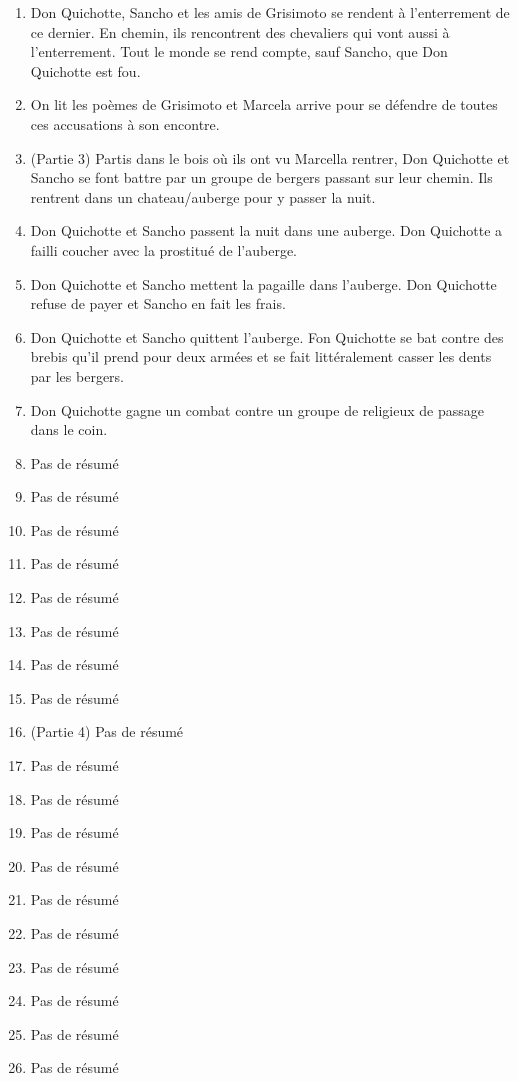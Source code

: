 \documentclass{article}
\begin{document}
\begin{enumerate}
    \item Don Quichotte, Sancho et les amis de Grisimoto se rendent à l'enterrement de ce dernier. En chemin, ils rencontrent des chevaliers qui vont aussi à l'enterrement. Tout le monde se rend compte, sauf Sancho, que Don Quichotte est fou.
    \item On lit les poèmes de Grisimoto et Marcela arrive pour se défendre de toutes ces accusations à son encontre.
    \item (Partie 3) Partis dans le bois où ils ont vu Marcella rentrer, Don Quichotte et Sancho se font battre par un groupe de bergers passant sur leur chemin. Ils rentrent dans un chateau/auberge pour y passer la nuit.
    \item Don Quichotte et Sancho passent la nuit dans une auberge. Don Quichotte a failli coucher avec la prostitué de l'auberge.
    \item Don Quichotte et Sancho mettent la pagaille dans l'auberge. Don Quichotte refuse de payer et Sancho en fait les frais.
    \item Don Quichotte et Sancho quittent l'auberge. Fon Quichotte se bat contre des brebis qu'il prend pour deux armées et se fait littéralement casser les dents par les bergers.
    \item Don Quichotte gagne un combat contre un groupe de religieux de passage dans le coin.
    \item Pas de résumé
    \item Pas de résumé
    \item Pas de résumé
    \item Pas de résumé
    \item Pas de résumé
    \item Pas de résumé
    \item Pas de résumé
    \item Pas de résumé
    \item (Partie 4) Pas de résumé
    \item Pas de résumé
    \item Pas de résumé
    \item Pas de résumé
    \item Pas de résumé
    \item Pas de résumé
    \item Pas de résumé
    \item Pas de résumé
    \item Pas de résumé
    \item Pas de résumé
    \item Pas de résumé

\end{enumerate}
\end{document}
